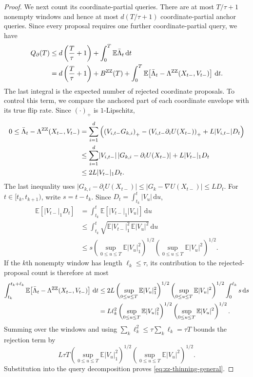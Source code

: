 \documentclass{amsart}
\theoremstyle{plain}
\theoremstyle{definition}
\theoremstyle{remark}
\newcommand{\ud}{\,\mathrm{d}}
\newcommand{\EE}{\mathbb{E}}
\newcommand{\abs}[1]{\lvert#1\rvert}
\newcommand{\E}{\EE}
\newcommand{\1}{\mathbf 1}
\newcommand{\dd}{\ud}
\newcommand{\pos}[1]{\left(#1\right)_+}
\newcommand{\zz}{{\rm ZZ}}
\begin{document}
\begin{proof}
We next count its coordinate-partial queries.  There are at most
$T/\tau+1$ nonempty windows and hence at most
$d(T/\tau+1)$ coordinate-partial anchor queries.  Since every proposal
requires one further coordinate-partial query, we have
\[
\begin{aligned}
        Q_\partial(T)
        &\le d\left(\frac{T}{\tau}+1\right)
             +\int_0^T\E\bar\Lambda_t\dd t\\
        &=d\left(\frac{T}{\tau}+1\right)+B^{\zz}(T)
          +\int_0^T\E\!\left[
            \bar\Lambda_t-\Lambda^{\zz}(X_{t-},V_{t-})
          \right]\dd t.
\end{aligned}
\]
The last integral is the expected number of rejected coordinate proposals.
To control this term, we compare the anchored part of each coordinate envelope
with its true flip rate.  Since $\pos{\cdot}$ is $1$-Lipschitz,
\[
\begin{aligned}
        0\le{}
        \bar\Lambda_t-\Lambda^{\zz}(X_{t-},V_{t-})
        &=\sum_{i=1}^d\left(
          \pos{V_{i,t-}G_{k,i}}
          -\pos{V_{i,t-}\partial_iU(X_{t-})}
          +L\abs{V_{i,t-}}D_t
        \right)\\
        &\le\sum_{i=1}^d\abs{V_{i,t-}}\,
          \abs{G_{k,i}-\partial_iU(X_{t-})}
          +L\abs{V_{t-}}_1D_t\\
        &\le2L\abs{V_{t-}}_1D_t.
\end{aligned}
\]
The last inequality uses
$\abs{G_{k,i}-\partial_iU(X_{t-})}
\le\abs{G_k-\nabla U(X_{t-})}\le L D_t$.
For $t\in[t_k,t_{k+1})$, write $s=t-t_k$.  Since
$D_t=\int_{t_k}^t\abs{V_u}\dd u$,
\[
\begin{aligned}
        \E[\abs{V_{t-}}_1D_t]
        &=\int_{t_k}^t
          \E[\abs{V_{t-}}_1\abs{V_u}]\dd u\\
        &\le\int_{t_k}^t
          \sqrt{\E\abs{V_{t-}}_1^2\,\E\abs{V_u}^2}\dd u\\
        &\le s
          \left(\sup_{0\le u\le T}\E\abs{V_u}_1^2\right)^{1/2}
          \left(\sup_{0\le u\le T}\E\abs{V_u}^2\right)^{1/2}.
\end{aligned}
\]
If the $k$th nonempty window has length $\ell_k\le\tau$, its contribution to
the rejected-proposal count is therefore at most
\[
\begin{aligned}
        \int_{t_k}^{t_k+\ell_k}
        \E\!\left[
          \bar\Lambda_t-\Lambda^{\zz}(X_{t-},V_{t-})
        \right]\dd t
        &\le2L
          \left(\sup_{0\le u\le T}\E\abs{V_u}_1^2\right)^{1/2}
          \left(\sup_{0\le u\le T}\E\abs{V_u}^2\right)^{1/2}
          \int_0^{\ell_k}s\dd s\\
        &=L\ell_k^2
          \left(\sup_{0\le u\le T}\E\abs{V_u}_1^2\right)^{1/2}
          \left(\sup_{0\le u\le T}\E\abs{V_u}^2\right)^{1/2}.
\end{aligned}
\]
Summing over the windows and using
$\sum_k\ell_k^2\le\tau\sum_k\ell_k=\tau T$ bounds the rejection term by
\[
        L\tau T
        \left(\sup_{0\le u\le T}\E\abs{V_u}_1^2\right)^{1/2}
        \left(\sup_{0\le u\le T}\E\abs{V_u}^2\right)^{1/2}.
\]
Substitution into the query decomposition proves
\eqref{eq:zz-thinning-general}.


\end{proof}
\end{document}
